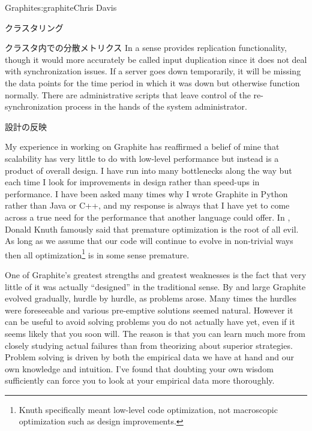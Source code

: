 \begin{aosachapter}{Graphite}{s:graphite}{Chris Davis}
\begin{aosasect1}{クラスタリング}
\begin{aosasect2}{クラスタ内での分散メトリクス}
In a sense  provides replication functionality, though it
would more accurately be called input duplication since it does not
deal with synchronization issues. If a server goes down temporarily,
it will be missing the data points for the time period in which it was
down but otherwise function normally. There are administrative scripts
that leave control of the re-synchronization process in the hands of
the system administrator.

\end{aosasect2}

\end{aosasect1}

\begin{aosasect1}{設計の反映}

My experience in working on Graphite has reaffirmed a belief of mine
that scalability has very little to do with low-level performance but
instead is a product of overall design. I have run into many
bottlenecks along the way but each time I look for improvements in
design rather than speed-ups in performance. I have been asked many
times why I wrote Graphite in Python rather than Java or C++, and my
response is always that I have yet to come across a true need for the
performance that another language could offer. In
\cite{bib:knuth:goto}, Donald Knuth famously said that premature
optimization is the root of all evil.  As long as we assume that our
code will continue to evolve in non-trivial ways then all
optimization\footnote{Knuth specifically meant low-level code
optimization, not macroscopic optimization such as design
improvements.} is in some sense premature.

One of Graphite's greatest strengths and greatest weaknesses is the
fact that very little of it was actually ``designed'' in the
traditional sense.  By and large Graphite evolved gradually, hurdle by
hurdle, as problems arose. Many times the hurdles were foreseeable and
various pre-emptive solutions seemed natural. However it can be useful
to avoid solving problems you do not actually have yet, even if it
seems likely that you soon will. The reason is that you can learn much
more from closely studying actual failures than from theorizing about
superior strategies.  Problem solving is driven by both the empirical
data we have at hand and our own knowledge and intuition. I've found
that doubting your own wisdom sufficiently can force you to look at
your empirical data more thoroughly.


\end{aosasect1}
\end{aosachapter}
